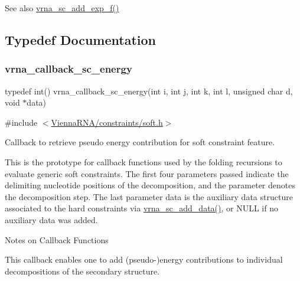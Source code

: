 \begin{DoxySeeAlso}{See also}
\mbox{\hyperlink{group__soft__constraints_ga87e382b5d0c9b7d9ce1b79c0473ff700}{vrna\+\_\+sc\+\_\+add\+\_\+exp\+\_\+f()}} 
\end{DoxySeeAlso}


\subsection{Typedef Documentation}
\mbox{\label{group__soft__constraints_ga88a266695d9e25cc12114dceb7b4565e}} 
\subsubsection{\texorpdfstring{vrna\_callback\_sc\_energy}{vrna\_callback\_sc\_energy}}
{\footnotesize\ttfamily typedef int() vrna\+\_\+callback\+\_\+sc\+\_\+energy(int i, int j, int k, int l, unsigned char d, void $\ast$data)}



{\ttfamily \#include $<$\mbox{\hyperlink{soft_8h}{Vienna\+R\+N\+A/constraints/soft.\+h}}$>$}



Callback to retrieve pseudo energy contribution for soft constraint feature. 

This is the prototype for callback functions used by the folding recursions to evaluate generic soft constraints. The first four parameters passed indicate the delimiting nucleotide positions of the decomposition, and the parameter {\ttfamily denotes} the decomposition step. The last parameter {\ttfamily data} is the auxiliary data structure associated to the hard constraints via \mbox{\hyperlink{group__soft__constraints_ga15c6d52471ec97897e2bb7f964f5deb6}{vrna\+\_\+sc\+\_\+add\+\_\+data()}}, or N\+U\+LL if no auxiliary data was added.

\begin{DoxyRefDesc}{Notes on Callback Functions}
\item[\mbox{\hyperlink{callbacks__callbacks000014}{Notes on Callback Functions}}]This callback enables one to add (pseudo-\/)energy contributions to individual decompositions of the secondary structure. \end{DoxyRefDesc}


